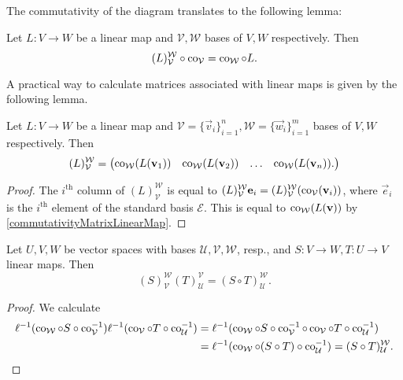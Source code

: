 The commutativity of the diagram translates to the following lemma:
\begin{lemma} \label{commutativityMatrixLinearMap}
Let $L:V\to W$ be a linear map and $\mathcal{V},\mathcal{W}$ bases of $V,W$ respectively. Then
\[ (L)^\mathcal{W}_\mathcal{V} \circ \operatorname{co}_\mathcal{V} = \operatorname{co}_{\mathcal{W}}\circ L. \]
\end{lemma}
A practical way to calculate matrices associated with linear maps is given by the following lemma.
\begin{lemma}
Let $L:V\to W$ be a linear map and $\mathcal{V}=\{\vec{v}_i\}_{i=1}^n,\mathcal{W} = \{\vec{w}_i\}_{i=1}^m$ bases of $V,W$ respectively. Then
\[ (L)^\mathcal{W}_\mathcal{V} = \begin{pmatrix}
\operatorname{co}_\mathcal{W}(L(\boldsymbol{\mathrm{v}}_1)) & \operatorname{co}_\mathcal{W}(L(\boldsymbol{\mathrm{v}}_2)) & \hdots & \operatorname{co}_\mathcal{W}(L(\boldsymbol{\mathrm{v}}_n)).
\end{pmatrix} \]
\end{lemma}
\begin{proof}
The $i^\text{th}$ column of $(L)^\mathcal{W}_\mathcal{V}$ is equal to $(L)^\mathcal{W}_\mathcal{V}\boldsymbol{\mathrm{e}}_i = (L)^\mathcal{W}_\mathcal{V}(\operatorname{co}_\mathcal{V}(\boldsymbol{\mathrm{v}}_i))$, where $\vec{e}_i$ is the $i^\text{th}$ element of the standard basis $\mathcal{E}$. This is equal to $\operatorname{co}_{\mathcal{W}}(L(\boldsymbol{\mathrm{v}}))$ by \ref{commutativityMatrixLinearMap}.
\end{proof}

\begin{proposition} \label{algebraMatricesLinearMaps}
Let $U,V,W$ be vector spaces with bases $\mathcal{U},\mathcal{V},\mathcal{W}$, resp., and $S:V\to W, T:U\to V$ linear maps. Then
\[ (S)_\mathcal{V}^\mathcal{W}(T)_\mathcal{U}^\mathcal{V} = (S\circ T)_{\mathcal{U}}^{\mathcal{W}}. \]
\end{proposition}
\begin{proof}
We calculate
\begin{align*}
\ell^{-1}(\operatorname{co}_{\mathcal{W}}\circ S \circ \operatorname{co}^{-1}_{\mathcal{V}})\ell^{-1}(\operatorname{co}_{\mathcal{V}}\circ T \circ \operatorname{co}^{-1}_{\mathcal{U}}) &= \ell^{-1}(\operatorname{co}_{\mathcal{W}}\circ S \circ \operatorname{co}^{-1}_{\mathcal{V}}\circ\operatorname{co}_{\mathcal{V}}\circ T \circ \operatorname{co}^{-1}_{\mathcal{U}}) \\
&= \ell^{-1}(\operatorname{co}_{\mathcal{W}}\circ (S \circ T) \circ \operatorname{co}^{-1}_{\mathcal{U}}) = (S\circ T)_{\mathcal{U}}^{\mathcal{W}}.
\end{align*}
\end{proof}

